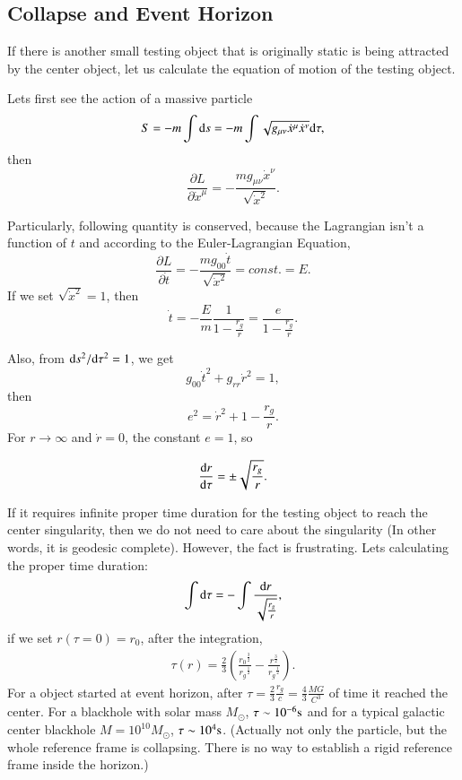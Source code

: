 \documentclass[openany,10pt]{book}
\theoremstyle{definition}
\theoremstyle{definition}
\theoremstyle{remark}
\newcommand{\be}{\begin{eqnarray}}
\newcommand{\ee}{\end{eqnarray}}
\begin{document}
\subsection{Collapse and Event Horizon}\label{Sch Co}
If there is another small testing object that is originally static is being attracted by the center object, let us calculate the equation of motion of the testing object.

Lets first see the action of a massive particle
\begin{equation}
    S=-m\int {\rm d}s=-m\int\sqrt{g_{\mu\nu} \dot x^\mu \dot x^\nu}{\rm d}\tau,
\end{equation}
then
\begin{equation}
    \frac{\partial L}{\partial \dot x^\mu}=-\frac{mg_{\mu\nu}\dot x^\nu}{\sqrt{\dot x^2}}.
\end{equation}

Particularly, following quantity is conserved, because the Lagrangian isn't a function of $t$ and according to the Euler-Lagrangian Equation,
\begin{equation}
    \frac{\partial L}{\partial \dot t}=-\frac{mg_{00}\dot t}{\sqrt{\dot x^2}}=const.=E.
\end{equation}
If we set $\sqrt{\dot x^2}=1$, then
\begin{equation}
    \dot t=-\frac{E}{m}\frac{1}{1-\frac{r_g}{r}}=\frac{e}{1-\frac{r_g}{r}}.
\end{equation}

Also, from ${\rm d}s^2/{\rm d}\tau^2=1$, we get
\begin{equation}
    g_{00}\dot t^2+g_{rr}\dot r^2=1,
\end{equation}
then
\begin{equation}
    e^2=\dot r^2+1-\frac{r_g}{r}.
\end{equation}
For $r \to \infty$ and $\dot r=0$, the constant $e=1$, so

\begin{equation}
    \frac{{\rm d}r}{{\rm d}\tau}=\pm \sqrt{\frac{r_g}{r}}.
\end{equation}

If it requires infinite proper time duration for the testing object to reach the center singularity, then we do not need to care about the singularity (In other words, it is geodesic complete). However, the fact is frustrating. Lets calculating the proper time duration:
\be
\int{\rm d}\tau=-\int\frac{{\rm d}r}{\sqrt{\frac{r_g}{r}}},
\ee
if we set $r(\tau=0)=r_0$, after the integration, 
\be
\tau(r)=\frac23\left(\frac{{r_0}^\frac32}{{r_g}^\frac12}-\frac{{r}^\frac32}{{r_g}^\frac12}\right).
\ee
For a object started at event horizon, after $\tau=\frac23\frac{r_g}{c}=\frac{4}{3}\frac{MG}{C^3}$ of time it reached the center. For a blackhole with solar mass $M_\odot$,  $\tau\sim10^{-6}{\rm s}$ and for a typical galactic center blackhole $M=10^{10}M_\odot$, $\tau\sim10^4 {\rm s}$. (Actually not only the particle, but the whole reference frame is collapsing. There is no way to establish a rigid reference frame inside the horizon.)\\
\end{document}
